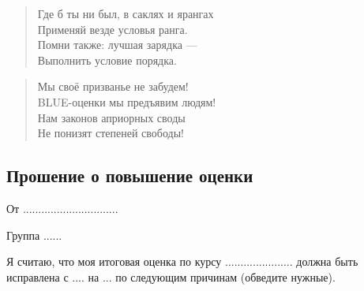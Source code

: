 \documentclass[12pt, a4paper]{article}
\begin{document}
\begin{verse}
Где б ты ни был, в саклях и ярангах \\
Применяй везде условья ранга. \\
Помни также: лучшая зарядка — \\
Выполнить условие порядка.
\end{verse}

\begin{verse}
Мы своё призванье не забудем! \\
BLUE-оценки мы предъявим людям! \\
Нам законов априорных своды \\
Не понизят степеней свободы!
\end{verse}



\subsection{Прошение о повышение оценки}

\vspace{10pt}
От ...............................

\vspace{10pt}
Группа ......

\vspace{10pt}
Я считаю, что моя итоговая оценка по курсу ...................... должна быть исправлена с .... на ... по следующим причинам (обведите нужные).
\end{document}
